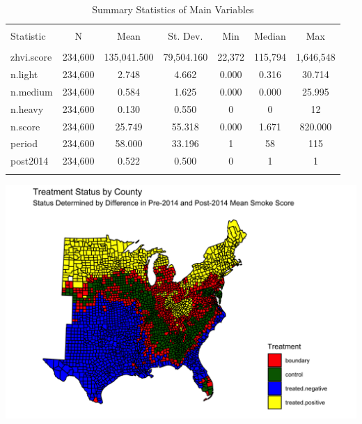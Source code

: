 \documentclass[12pt]{article}
\begin{document}
\begin{table}[!htbp] \centering 
  \caption{Summary Statistics of Main Variables} 
  \label{} 
\begin{tabular}{@{\extracolsep{5pt}}lcccccc} 
\\[-1.8ex]\hline 
\hline \\[-1.8ex] 
Statistic & \multicolumn{1}{c}{N} & \multicolumn{1}{c}{Mean} & \multicolumn{1}{c}{St. Dev.} & \multicolumn{1}{c}{Min} & \multicolumn{1}{c}{Median} & \multicolumn{1}{c}{Max} \\ 
\hline \\[-1.8ex] 
zhvi.score & 234,600 & 135,041.500 & 79,504.160 & 22,372 & 115,794 & 1,646,548 \\ 
n.light & 234,600 & 2.748 & 4.662 & 0.000 & 0.316 & 30.714 \\ 
n.medium & 234,600 & 0.584 & 1.625 & 0.000 & 0.000 & 25.995 \\ 
n.heavy & 234,600 & 0.130 & 0.550 & 0 & 0 & 12 \\ 
n.score & 234,600 & 25.749 & 55.318 & 0.000 & 1.671 & 820.000 \\ 
period & 234,600 & 58.000 & 33.196 & 1 & 58 & 115 \\ 
post2014 & 234,600 & 0.522 & 0.500 & 0 & 1 & 1 \\ 
\hline \\[-1.8ex] 
\end{tabular} 
\end{table}

\includegraphics[scale = 0.15]{transparent}
\end{document}
